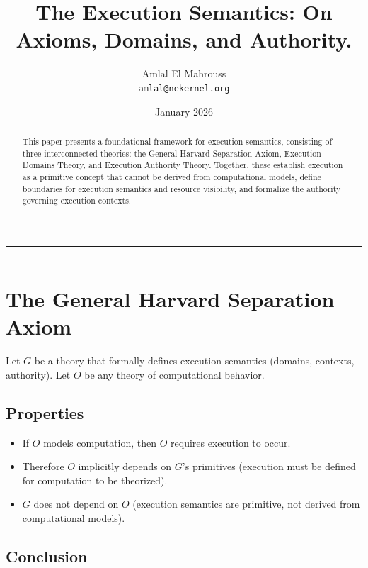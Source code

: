 \documentclass[11pt,a4paper]{article}
\title{The Execution Semantics: On Axioms, Domains, and Authority.}
\author{Amlal El Mahrouss\\
\texttt{amlal@nekernel.org}}
\date{January 2026}
\begin{document}
\bf \maketitle

\begin{center}
	\rule[0.01cm]{17cm}{0.01cm}
\end{center}

\begin{abstract}
This paper presents a foundational framework for execution semantics, consisting of three interconnected theories: the General Harvard Separation Axiom, Execution Domains Theory, and Execution Authority Theory. Together, these establish execution as a primitive concept that cannot be derived from computational models, define boundaries for execution semantics and resource visibility, and formalize the authority governing execution contexts.
\end{abstract}

\begin{center}
	\rule[1cm]{17cm}{0.01cm}
\end{center}

\section{The General Harvard Separation Axiom}

Let $G$ be a theory that formally defines execution semantics (domains, contexts, authority). Let $O$ be any theory of computational behavior.

\subsection{Properties}

\begin{itemize}
    \item If $O$ models computation, then $O$ requires execution to occur.
    \item Therefore $O$ implicitly depends on $G$'s primitives (execution must be defined for computation to be theorized).
    \item $G$ does not depend on $O$ (execution semantics are primitive, not derived from computational models).
\end{itemize}

\subsection{Conclusion}
\end{document}
